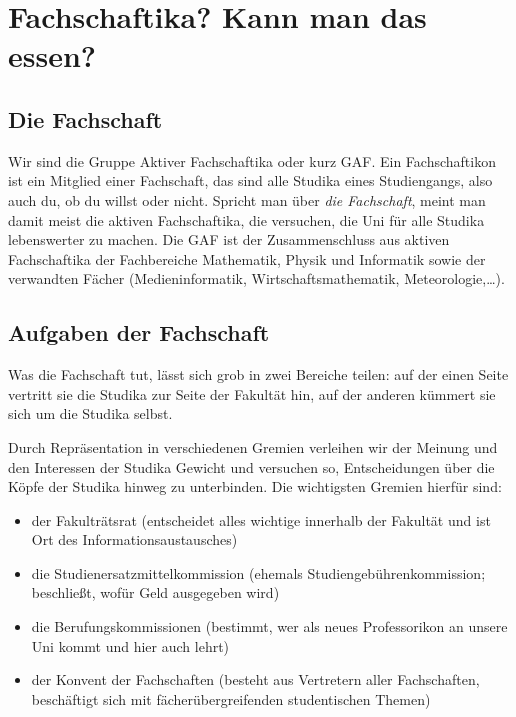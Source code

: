 \chapter{Fachschaftika? Kann man das essen?}

\section{Die Fachschaft}
Wir sind die Gruppe Aktiver Fachschaftika oder kurz GAF. Ein Fachschaftikon ist ein Mitglied einer Fachschaft, das sind alle Studika eines Studiengangs, also auch du, ob du willst oder nicht. Spricht man über \emph{die Fachschaft}, meint man damit meist die aktiven Fachschaftika, die versuchen, die Uni für alle Studika lebenswerter zu machen. Die GAF ist der Zusammenschluss aus aktiven Fachschaftika der Fachbereiche Mathematik, Physik und Informatik sowie der verwandten Fächer (Medieninformatik, Wirtschaftsmathematik, Meteorologie,\ldots).

\section{Aufgaben der Fachschaft}

Was die Fachschaft tut, lässt sich grob in zwei Bereiche teilen: auf der einen Seite vertritt sie die Studika zur Seite der Fakultät hin, auf der anderen kümmert sie sich um die Studika selbst.

Durch Repräsentation in verschiedenen Gremien verleihen wir der Meinung und den Interessen der Studika Gewicht und versuchen so, Entscheidungen über die Köpfe der Studika hinweg zu unterbinden. Die wichtigsten Gremien hierfür sind:
\begin{itemize}
\item der Fakulträtsrat (entscheidet alles wichtige innerhalb der Fakultät und ist Ort des Informationsaustausches)
\item die Studienersatzmittelkommission (ehemals Studiengebührenkommission; beschließt, wofür Geld ausgegeben wird)
\item die Berufungskommissionen (bestimmt, wer als neues Professorikon an unsere Uni kommt und hier auch lehrt)
\item der Konvent der Fachschaften (besteht aus Vertretern aller Fachschaften, beschäftigt sich mit fächerübergreifenden studentischen Themen)
\end{itemize}

